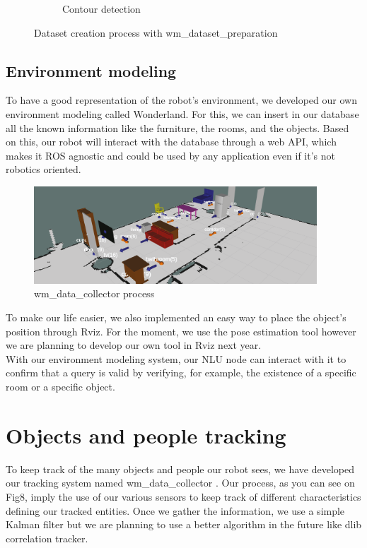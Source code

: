 \documentclass[runningheads,a4paper]{llncs}
\begin{document}
\begin{figure}[h!]
\begin{subfigure}[b]{0.3\linewidth}
    \caption{Contour detection}
  \end{subfigure}
  \caption{Dataset creation process with wm\_dataset\_preparation}
  \label{fig:coffee}
\end{figure}  
 
\subsection{Environment modeling}
\tab To have a good representation of the robot's environment, we developed our own environment modeling called Wonderland. For this, we can insert in our database all the known information like the furniture, the rooms, and the objects. Based on this, our robot will interact with the database through a web API, which makes it ROS agnostic and could be used by any application even if it's not robotics oriented.\\

\begin{figure}
  \centering
  \includegraphics[width=300pt]{images/wonderland.png}
  \caption{ wm\_data\_collector process}
\end{figure} 

To make our life easier, we also implemented an easy way to place the object's position through Rviz. For the moment, we use the pose estimation tool however we are planning to develop our own tool in Rviz next year.\\

With our environment modeling system, our NLU node can interact with it to confirm that a query is valid by verifying, for example, the existence of a specific room or a specific object.  \\

\section{Objects and people tracking}

\tab To keep track of the many objects and people our robot sees, we have developed our tracking system named wm\_data\_collector \cite{datacollector}. Our process, as you can see on Fig8, imply the use of our various sensors to keep track of different characteristics defining our tracked entities. Once we gather the information, we use a simple Kalman filter but we are planning to use a better algorithm in the future like dlib correlation tracker. \\
\end{document}
